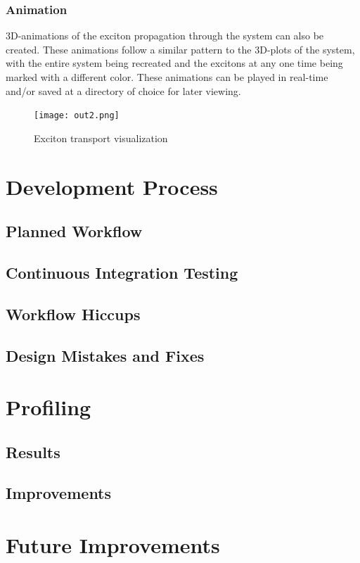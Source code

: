 \documentclass{article}
\begin{document}
\subsubsection{Animation}
3D-animations of the exciton propagation through the system can also be created. These animations follow a similar pattern to the 3D-plots of the system, with the entire system being recreated and the excitons at any one time being marked with a different color. These animations can be played in real-time and/or saved at a directory of choice for later viewing. 


\begin{figure}
    \centering
   \texttt{[image: out2.png]}
    \caption{Exciton transport visualization}
    \label{fig:my_label}
\end{figure}

\section{Development Process}

\subsection{Planned Workflow}

\subsection{Continuous Integration Testing}

\subsection{Workflow Hiccups}

\subsection{Design Mistakes and Fixes}



\section{Profiling}

\subsection{Results}

\subsection{Improvements}




\section{Future Improvements}





\printbibliography
\end{document}
